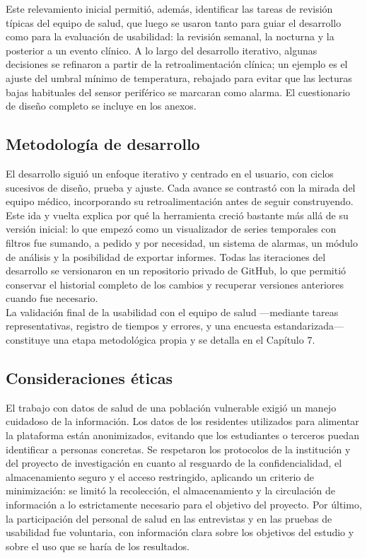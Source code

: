 Este relevamiento inicial permitió, además, identificar las tareas de revisión típicas del equipo de salud, que luego se usaron tanto para guiar el desarrollo como para la evaluación de usabilidad: la revisión semanal, la nocturna y la posterior a un evento clínico. A lo largo del desarrollo iterativo, algunas decisiones se refinaron a partir de la retroalimentación clínica; un ejemplo es el ajuste del umbral mínimo de temperatura, rebajado para evitar que las lecturas bajas habituales del sensor periférico se marcaran como alarma. El cuestionario de diseño completo se incluye en los anexos.\\


\subsection{Metodología de desarrollo}
El desarrollo siguió un enfoque iterativo y centrado en el usuario, con ciclos sucesivos de diseño, prueba y ajuste. Cada avance se contrastó con la mirada del equipo médico, incorporando su retroalimentación antes de seguir construyendo. Este ida y vuelta explica por qué la herramienta creció bastante más allá de su versión inicial: lo que empezó como un visualizador de series temporales con filtros fue sumando, a pedido y por necesidad, un sistema de alarmas, un módulo de análisis y la posibilidad de exportar informes. Todas las iteraciones del desarrollo se versionaron en un repositorio privado de GitHub, lo que permitió conservar el historial completo de los cambios y recuperar versiones anteriores cuando fue necesario.\\

La validación final de la usabilidad con el equipo de salud —mediante tareas representativas, registro de tiempos y errores, y una encuesta estandarizada— constituye una etapa metodológica propia y se detalla en el Capítulo 7.\\


\subsection{Consideraciones éticas}
El trabajo con datos de salud de una población vulnerable exigió un manejo cuidadoso de la información. Los datos de los residentes utilizados para alimentar la plataforma están anonimizados, evitando que los estudiantes o terceros puedan identificar a personas concretas. Se respetaron los protocolos de la institución y del proyecto de investigación en cuanto al resguardo de la confidencialidad, el almacenamiento seguro y el acceso restringido, aplicando un criterio de minimización: se limitó la recolección, el almacenamiento y la circulación de información a lo estrictamente necesario para el objetivo del proyecto. Por último, la participación del personal de salud en las entrevistas y en las pruebas de usabilidad fue voluntaria, con información clara sobre los objetivos del estudio y sobre el uso que se haría de los resultados.\\


